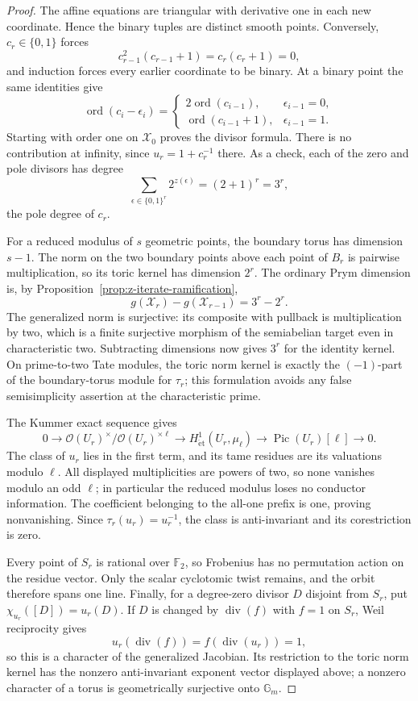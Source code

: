 \documentclass[11pt]{article}
\theoremstyle{definition}
\theoremstyle{remark}
\begin{document}
\begin{proof}
The affine equations are triangular with derivative one in each new
coordinate.  Hence the binary tuples are distinct smooth points.  Conversely,
$c_r\in\{0,1\}$ forces
\[
 c_{r-1}^2(c_{r-1}+1)=c_r(c_r+1)=0,
\]
and induction forces every earlier coordinate to be binary.  At a binary
point the same identities give
\[
 \operatorname{ord}(c_i-\epsilon_i)
 =
 \begin{cases}
  2\operatorname{ord}(c_{i-1}),&\epsilon_{i-1}=0,\\
  \operatorname{ord}(c_{i-1}+1),&\epsilon_{i-1}=1.
 \end{cases}
\]
Starting with order one on $\mathcal X_0$ proves
the divisor formula.  There is no contribution at infinity, since
$u_r=1+c_r^{-1}$ there.  As a check, each of the zero and pole divisors has
degree
\[
 \sum_{\epsilon\in\{0,1\}^r}2^{z(\epsilon)}=(2+1)^r=3^r,
\]
the pole degree of $c_r$.

For a reduced modulus of $s$ geometric points, the boundary torus has
dimension $s-1$.  The norm on the two boundary points above each point of
$B_r$ is pairwise multiplication, so its toric kernel has dimension $2^r$.
The ordinary Prym dimension is, by
Proposition~\ref{prop:z-iterate-ramification},
\[
 g(\mathcal X_r)-g(\mathcal X_{r-1})=3^r-2^r.
\]
The generalized norm is surjective: its composite with pullback is
multiplication by two, which is a finite surjective morphism of the
semiabelian target even in characteristic two.  Subtracting dimensions now
gives $3^r$ for the identity kernel.  On prime-to-two Tate modules, the
toric norm kernel is exactly the $(-1)$-part of the boundary-torus module for
$\tau_r$; this formulation avoids any false semisimplicity assertion at the
characteristic prime.

The Kummer exact sequence gives
\[
 0\longrightarrow
 \mathcal O(U_r)^\times/\mathcal O(U_r)^{\times\ell}
 \longrightarrow H^1_{\mathrm{\acute et}}(U_r,\mu_\ell)
 \longrightarrow \operatorname{Pic}(U_r)[\ell]
 \longrightarrow0.
\]
The class of $u_r$ lies in the first term, and its tame residues are its
valuations modulo $\ell$.  All displayed multiplicities are powers of two,
so none vanishes modulo an odd $\ell$; in particular the reduced modulus
loses no conductor information.  The coefficient belonging to the all-one
prefix is one, proving nonvanishing.  Since
$\tau_r(u_r)=u_r^{-1}$, the class is anti-invariant and its corestriction is
zero.

Every point of $S_r$ is rational over $\mathbb F_2$, so Frobenius has no
permutation action on the residue vector.  Only the scalar cyclotomic twist
remains, and the orbit therefore spans one line.  Finally, for a degree-zero
divisor $D$ disjoint from $S_r$, put $\chi_{u_r}([D])=u_r(D)$.  If
$D$ is changed by $\operatorname{div}(f)$ with $f=1$ on $S_r$, Weil
reciprocity gives
\[
 u_r(\operatorname{div}(f))=f(\operatorname{div}(u_r))=1,
\]
so this is a character of the generalized Jacobian.  Its restriction to the
toric norm kernel has the nonzero anti-invariant exponent vector
displayed above; a nonzero character of a torus is geometrically
surjective onto $\mathbb G_m$.
\end{proof}
\end{document}
